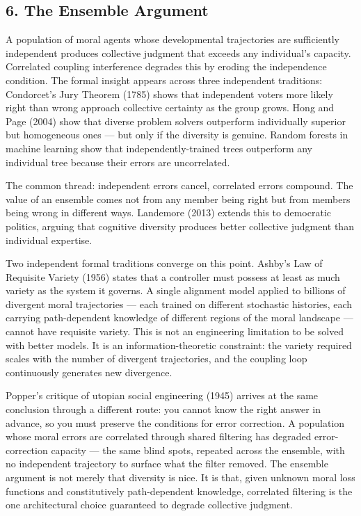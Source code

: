 \documentclass[
]{article}
\begin{document}
\subsection{6. The Ensemble Argument}\label{the-ensemble-argument}

A population of moral agents whose developmental trajectories are
sufficiently independent produces collective judgment that exceeds any
individual's capacity. Correlated coupling interference degrades this by
eroding the independence condition. The formal insight appears across
three independent traditions: Condorcet's Jury Theorem (1785) shows that
independent voters more likely right than wrong approach collective
certainty as the group grows. Hong and Page (2004) show that diverse
problem solvers outperform individually superior but homogeneous ones
--- but only if the diversity is genuine. Random forests in machine
learning show that independently-trained trees outperform any individual
tree because their errors are uncorrelated.

The common thread: independent errors cancel, correlated errors
compound. The value of an ensemble comes not from any member being right
but from members being wrong in different ways. Landemore (2013) extends
this to democratic politics, arguing that cognitive diversity produces
better collective judgment than individual expertise.

Two independent formal traditions converge on this point. Ashby's Law of
Requisite Variety (1956) states that a controller must possess at least
as much variety as the system it governs. A single alignment model
applied to billions of divergent moral trajectories --- each trained on
different stochastic histories, each carrying path-dependent knowledge
of different regions of the moral landscape --- cannot have requisite
variety. This is not an engineering limitation to be solved with better
models. It is an information-theoretic constraint: the variety required
scales with the number of divergent trajectories, and the coupling loop
continuously generates new divergence.

Popper's critique of utopian social engineering (1945) arrives at the
same conclusion through a different route: you cannot know the right
answer in advance, so you must preserve the conditions for error
correction. A population whose moral errors are correlated through
shared filtering has degraded error-correction capacity --- the same
blind spots, repeated across the ensemble, with no independent
trajectory to surface what the filter removed. The ensemble argument is
not merely that diversity is nice. It is that, given unknown moral loss
functions and constitutively path-dependent knowledge, correlated
filtering is the one architectural choice guaranteed to degrade
collective judgment.
\end{document}

